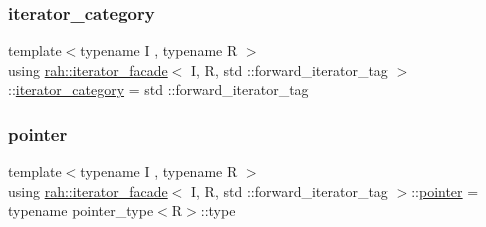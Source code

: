 \subsubsection{\texorpdfstring{iterator\_category}{iterator\_category}\hspace{0.1cm}{\footnotesize\ttfamily [2/2]}}
{\footnotesize\ttfamily template$<$typename I , typename R $>$ \\
using \mbox{\hyperlink{structrah_1_1iterator__facade}{rah\+::iterator\+\_\+facade}}$<$ I, R, std \+::forward\+\_\+iterator\+\_\+tag $>$\+::\mbox{\hyperlink{structrah_1_1iterator__facade_3_01_i_00_01_r_00_01std_01_1_1forward__iterator__tag_01_4_a3c1278be55ca5af439eb79e2ee9a3c49}{iterator\+\_\+category}} =  std \+::forward\+\_\+iterator\+\_\+tag}

\mbox{\label{structrah_1_1iterator__facade_3_01_i_00_01_r_00_01std_01_1_1forward__iterator__tag_01_4_a341d48f3cb5b1df5da4ee7b7bc77a4c2}} 
\subsubsection{\texorpdfstring{pointer}{pointer}\hspace{0.1cm}{\footnotesize\ttfamily [1/2]}}
{\footnotesize\ttfamily template$<$typename I , typename R $>$ \\
using \mbox{\hyperlink{structrah_1_1iterator__facade}{rah\+::iterator\+\_\+facade}}$<$ I, R, std \+::forward\+\_\+iterator\+\_\+tag $>$\+::\mbox{\hyperlink{structrah_1_1iterator__facade_3_01_i_00_01_r_00_01std_01_1_1forward__iterator__tag_01_4_a341d48f3cb5b1df5da4ee7b7bc77a4c2}{pointer}} =  typename pointer\+\_\+type$<$R$>$\+::type}

\mbox{\label{structrah_1_1iterator__facade_3_01_i_00_01_r_00_01std_01_1_1forward__iterator__tag_01_4_a341d48f3cb5b1df5da4ee7b7bc77a4c2}} 
